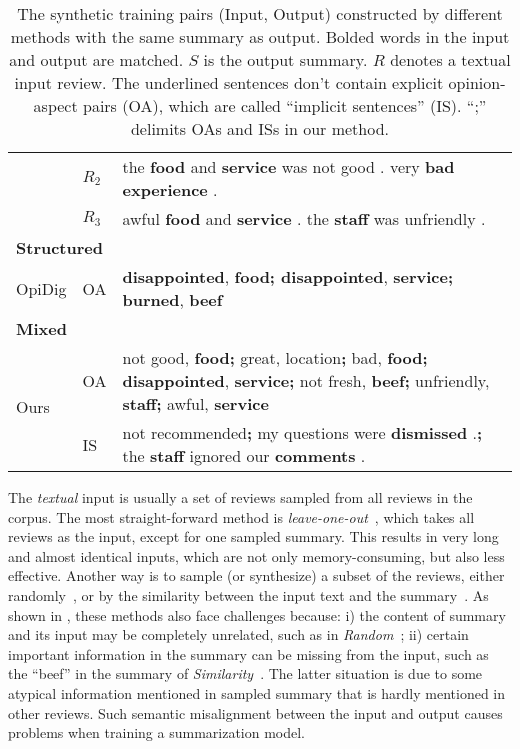{\begin{table}[th]
{\begin{tabular}{|m{0.9cm}|m{0.3cm}<{\centering}|m{5.8cm}|}
		\cline{2-3}
		& $R_2$& the \textbf{food} and \textbf{service} was not good . very \textbf{bad experience} .
		\\
		\cline{2-3}
		& $R_3$ &awful \textbf{food} and \textbf{service} . the \textbf{staff} was unfriendly .
		\\
		\hline
		\multicolumn{3}{|l|}{\bf Structured} \\
		\hline
		OpiDig & OA & \textbf{disappointed}, \textbf{food; disappointed}, \textbf{service; burned}, \textbf{beef}
		\\
		\hline
		\multicolumn{3}{|l|}{\bf Mixed} \\
		\hline
		\multirow{2}{0.1cm}{Ours} & OA &not good, \textbf{food;} great, location\textbf{;} bad, \textbf{food; disappointed}, \textbf{service;} not fresh, \textbf{beef;} unfriendly, \textbf{staff;} awful, \textbf{service}\\
		\cline{2-3}
		& IS &not recommended\textbf{;} my questions were \textbf{dismissed} .\textbf{;} the \textbf{staff} ignored our \textbf{comments} .\\
		\hline
	\end{tabular}
}
	\caption{The synthetic training pairs (Input, Output) constructed by different methods with the same summary as output. 
		Bolded words in the input and output are matched.
	   $S$ is the output summary. 
	   $R$ denotes a textual input review. 
		The underlined sentences don't contain explicit opinion-aspect pairs (OA), 
		which are called ``implicit sentences'' (IS).  
		``;'' delimits OAs and ISs in our method. 
		}\label{tab:previous_data}  
\end{table}
}%

The {\em textual} input is usually a set of reviews sampled 
from all reviews in the corpus. 
The most straight-forward method is {\em leave-one-out}~\cite{Copycat20,transsum21}, 
which takes all reviews as the input, except for one sampled summary. 
This results in very long and almost identical inputs, which are not only memory-consuming,
but also less effective.
Another way is to sample (or synthesize) a subset of the reviews, 
either randomly~\cite{Fewshot20}, or by the similarity between the input text and 
the summary~\cite{Denoise20,Plansum20}.
As shown in , 
these methods also face challenges because: 
i) the content of summary and its input may be completely unrelated, 
such as in {\em Random}~\cite{Fewshot20}; 
ii) certain important information in the summary can be missing from the input, 
such as the ``beef'' in the summary of {\em Similarity}~\cite{Plansum20}.
The latter situation is due to some atypical information mentioned in sampled summary 
that is hardly mentioned in other reviews. Such semantic misalignment between the 
input and output causes problems when training a summarization model.

